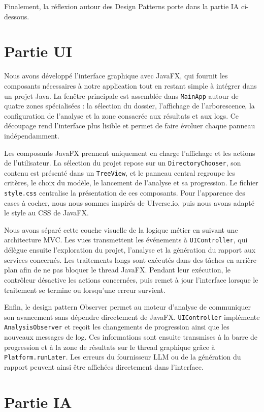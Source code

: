 \documentclass[11pt,a4paper]{article}
\begin{document}
Finalement, la réflexion autour des Design Patterns porte dans la partie IA ci-dessous.

\section{Partie UI}
Nous avons développé l'interface graphique avec JavaFX, qui fournit les composants nécessaires à notre application tout en restant simple à intégrer dans un projet Java. La fenêtre principale est assemblée dans \texttt{MainApp} autour de quatre zones spécialisées : la sélection du dossier, l'affichage de l'arborescence, la configuration de l'analyse et la zone consacrée aux résultats et aux logs. Ce découpage rend l'interface plus lisible et permet de faire évoluer chaque panneau indépendamment.

Les composants JavaFX prennent uniquement en charge l'affichage et les actions de l'utilisateur. La sélection du projet repose sur un \texttt{DirectoryChooser}, son contenu est présenté dans un \texttt{TreeView}, et le panneau central regroupe les critères, le choix du modèle, le lancement de l'analyse et sa progression. Le fichier \texttt{style.css} centralise la présentation de ces composants. Pour l'apparence des cases à cocher, nous nous sommes inspirés de UIverse.io, puis nous avons adapté le style au CSS de JavaFX.

Nous avons séparé cette couche visuelle de la logique métier en suivant une architecture MVC. Les vues transmettent les événements à \texttt{UIController}, qui délègue ensuite l'exploration du projet, l'analyse et la génération du rapport aux services concernés. Les traitements longs sont exécutés dans des tâches en arrière-plan afin de ne pas bloquer le thread JavaFX. Pendant leur exécution, le contrôleur désactive les actions concernées, puis remet à jour l'interface lorsque le traitement se termine ou lorsqu'une erreur survient.

Enfin, le design pattern Observer permet au moteur d'analyse de communiquer son avancement sans dépendre directement de JavaFX. \texttt{UIController} implémente \texttt{AnalysisObserver} et reçoit les changements de progression ainsi que les nouveaux messages de log. Ces informations sont ensuite transmises à la barre de progression et à la zone de résultats sur le thread graphique grâce à \texttt{Platform.runLater}. Les erreurs du fournisseur LLM ou de la génération du rapport peuvent ainsi être affichées directement dans l'interface.

\section{Partie IA}
\end{document}
